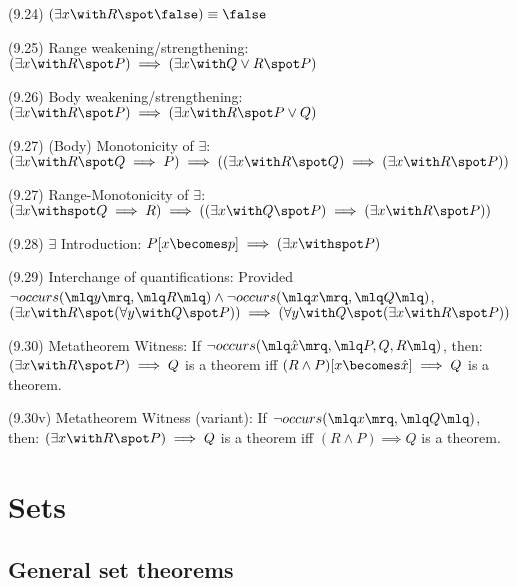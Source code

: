 \documentclass[a4paper,10pt]{article}
\newenvironment{theoremlist}{
\begin{description}
  \setlength{\itemsep}{1.5pt}
  \setlength{\parskip}{0pt}
  \setlength{\parsep}{0pt}
}{\end{description}}
\begin{document}
\begin{theoremlist}
\item[(9.24)]									$ (\exists x \with R \spot \false) \equiv \false $
\item[(9.25) Range weakening/strengthening:]					$ (\exists x \with R \spot P) \implies (\exists x \with Q \lor R \spot P) $
\item[(9.26) Body weakening/strengthening:]					$ (\exists x \with R \spot P) \implies (\exists x \with R \spot P \lor Q) $
\item[(9.27) (Body) Monotonicity of $\exists$:]					$ (\exists x \with R \spot Q \implies P) \implies ((\exists x \with R \spot Q) \implies (\exists x \with R \spot P)) $
\item[(9.27) Range-Monotonicity of $\exists$:]					$ (\exists x \withspot Q \implies R) \implies ((\exists x \with Q \spot P) \implies (\exists x \with R \spot P)) $
\item[(9.28) $\exists$ Introduction:]						$ P[x \becomes p] \implies (\exists x \withspot P) $

\item[(9.29) Interchange of quantifications:]					Provided $ \lnot occurs (\mlq y \mrq, \mlq R \mlq) \land \lnot occurs (\mlq x \mrq, \mlq Q \mlq)$,\newline
										$ (\exists x \with R \spot (\forall y \with Q \spot P)) \implies (\forall y \with Q \spot (\exists x \with R \spot P)) $

\item[(9.30) Metatheorem Witness:]						If $ \lnot occurs (\mlq \hat{x} \mrq, \mlq P,Q,R \mlq)$, then:\newline
										$ (\exists x \with R \spot P) \implies Q $ is a theorem iff $ (R \land P)[x \becomes \hat{x}] \implies Q $ is a theorem.

\item[(9.30v) Metatheorem Witness (variant):]					If $ \lnot occurs (\mlq x \mrq, \mlq Q \mlq)$, then:\newline
										$ (\exists x \with R \spot P) \implies Q $ is a theorem iff $ (R \land P) \implies Q $ is a theorem.

\end{theoremlist}

\section{Sets}
\subsection{General set theorems}
\end{document}
